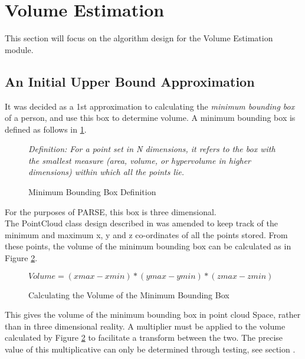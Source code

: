 \section{Volume Estimation}
\label{design:volume estimation}
This section will focus on the algorithm design for the Volume Estimation module.

\subsection{An Initial Upper Bound Approximation}
\label{design: an initial upper bound approximation}
It was decided as a 1st approximation to calculating the \textit{minimum bounding box} of a person, and use this box to determine volume.
 A minimum bounding box is defined as follows in \ref{fig:bounding_box_definition}.\\

\begin{figure}[h]
\textit{Definition: For a point set in N dimensions, it refers to the box with the smallest measure (area, volume, or hypervolume in higher dimensions) within which all the points lie.}
\caption {Minimum Bounding Box Definition \cite{Barequet2001}}
\label{fig:bounding_box_definition}
\end{figure}

For the purposes of PARSE, this box is three dimensional.\\

The PointCloud class design described in  was amended to keep track of the minimum and maximum x, y and z co-ordinates of all the points stored. 
From these points, the volume of the minimum bounding box can be calculated as in Figure \ref{fig:calculating_the_volume_of_the_minimum_bounding_box}.\\

\begin{figure}[h]
\begin{center}
$Volume = (xmax -xmin) * (ymax - ymin) * (zmax - zmin)$
\end{center}
\caption{Calculating the Volume of the Minimum Bounding Box}
\label{fig:calculating_the_volume_of_the_minimum_bounding_box}
\end{figure}

This gives the volume of the minimum bounding box in point cloud Space, rather than in three dimensional reality.
A multiplier must be applied to the volume calculated by Figure \ref{fig:calculating_the_volume_of_the_minimum_bounding_box} to facilitate a transform between the two. 
The precise value of this multiplicative can only be determined through testing, see section .\\
